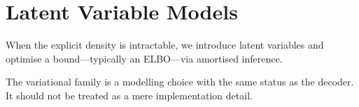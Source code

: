 \chapter{Latent Variable Models}
\label{ch:latent-variables}

When the explicit density is intractable, we introduce latent variables and optimise a bound---typically an ELBO---via amortised inference.

The variational family is a modelling choice with the same status as the decoder. It should not be treated as a mere implementation detail.
